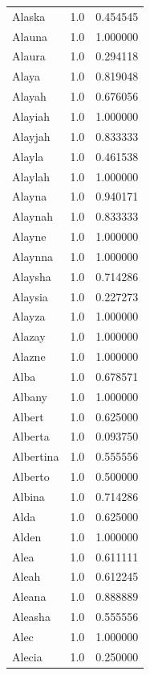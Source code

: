 \documentclass[
  letterpaper,
  DIV=11,
  numbers=noendperiod]{scrreprt}
\begin{document}
\begin{tabular}{lrr}
Alaska          &   1.0 &   0.454545 \\
Alauna          &   1.0 &   1.000000 \\
Alaura          &   1.0 &   0.294118 \\
Alaya           &   1.0 &   0.819048 \\
Alayah          &   1.0 &   0.676056 \\
Alayiah         &   1.0 &   1.000000 \\
Alayjah         &   1.0 &   0.833333 \\
Alayla          &   1.0 &   0.461538 \\
Alaylah         &   1.0 &   1.000000 \\
Alayna          &   1.0 &   0.940171 \\
Alaynah         &   1.0 &   0.833333 \\
Alayne          &   1.0 &   1.000000 \\
Alaynna         &   1.0 &   1.000000 \\
Alaysha         &   1.0 &   0.714286 \\
Alaysia         &   1.0 &   0.227273 \\
Alayza          &   1.0 &   1.000000 \\
Alazay          &   1.0 &   1.000000 \\
Alazne          &   1.0 &   1.000000 \\
Alba            &   1.0 &   0.678571 \\
Albany          &   1.0 &   1.000000 \\
Albert          &   1.0 &   0.625000 \\
Alberta         &   1.0 &   0.093750 \\
Albertina       &   1.0 &   0.555556 \\
Alberto         &   1.0 &   0.500000 \\
Albina          &   1.0 &   0.714286 \\
Alda            &   1.0 &   0.625000 \\
Alden           &   1.0 &   1.000000 \\
Alea            &   1.0 &   0.611111 \\
Aleah           &   1.0 &   0.612245 \\
Aleana          &   1.0 &   0.888889 \\
Aleasha         &   1.0 &   0.555556 \\
Alec            &   1.0 &   1.000000 \\
Alecia          &   1.0 &   0.250000 \\

\end{tabular}
\end{document}
